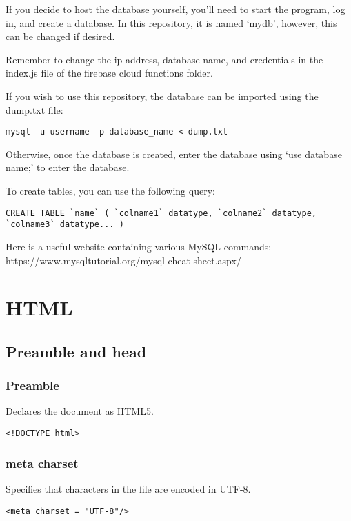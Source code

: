 \documentclass[letterpaper]{article}
\begin{document}
If you decide to host the database yourself, you'll need to start the program, log in, and create a database.
In this repository, it is named `mydb', however, this can be changed if desired.

Remember to change the ip address, database name, and credentials in the index.js file of the firebase cloud functions folder.

If you wish to use this repository, the database can be imported using the dump.txt file:

\lstinline{mysql -u username -p database_name < dump.txt}

Otherwise, once the database is created, enter the database using `use database name;' to enter the database.

To create tables, you can use the following query:

\lstinline{CREATE TABLE `name` ( `colname1` datatype, `colname2` datatype, `colname3` datatype... )}

Here is a useful website containing various MySQL commands: https://www.mysqltutorial.org/mysql-cheat-sheet.aspx/

\newpage

\section{HTML}\label{HTML}

\subsection{Preamble and head}

\subsubsection{Preamble}

Declares the document as HTML5.
\begin{lstlisting}[firstnumber=1]
<!DOCTYPE html>
\end{lstlisting}

\subsubsection{meta charset}

Specifies that characters in the file are encoded in UTF-8.
\begin{lstlisting}[firstnumber=4]
<meta charset = "UTF-8"/>
\end{lstlisting}
\end{document}
